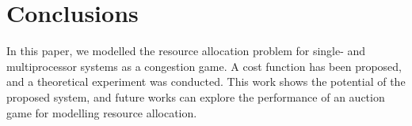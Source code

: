 \section{Conclusions}

In this paper, we modelled the resource allocation problem for single- and multiprocessor systems as a congestion game. A cost function has been proposed, and a theoretical experiment was conducted. This work shows the potential of the proposed system, and future works can explore the performance of an auction game for modelling resource allocation. 
